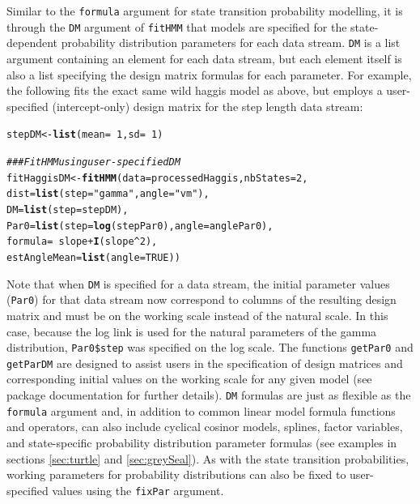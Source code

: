 \documentclass[12pt]{article}\usepackage[]{graphicx}\usepackage[]{color}
\makeatletter
\newcommand{\hlnum}[1]{\textcolor[rgb]{0.686,0.059,0.569}{#1}}%
\newcommand{\hlstr}[1]{\textcolor[rgb]{0.192,0.494,0.8}{#1}}%
\newcommand{\hlcom}[1]{\textcolor[rgb]{0.678,0.584,0.686}{\textit{#1}}}%
\newcommand{\hlopt}[1]{\textcolor[rgb]{0,0,0}{#1}}%
\newcommand{\hlstd}[1]{\textcolor[rgb]{0.345,0.345,0.345}{#1}}%
\newcommand{\hlkwb}[1]{\textcolor[rgb]{0.69,0.353,0.396}{#1}}%
\newcommand{\hlkwc}[1]{\textcolor[rgb]{0.333,0.667,0.333}{#1}}%
\newcommand{\hlkwd}[1]{\textcolor[rgb]{0.737,0.353,0.396}{\textbf{#1}}}%
\newenvironment{kframe}{%
 \def\at@end@of@kframe{}%
 \ifinner\ifhmode%
  \def\at@end@of@kframe{\end{minipage}}%
  \begin{minipage}{\columnwidth}%
 \fi\fi%
 \def\FrameCommand##1{\hskip\@totalleftmargin \hskip-\fboxsep
 \colorbox{shadecolor}{##1}\hskip-\fboxsep
     \hskip-\linewidth \hskip-\@totalleftmargin \hskip\columnwidth}%
 \MakeFramed {\advance\hsize-\width
   \@totalleftmargin\z@ \linewidth\hsize
   \@setminipage}}%
 {\par\unskip\endMakeFramed%
 \at@end@of@kframe}
\newenvironment{knitrout}{}{} %
\makeatother
\begin{document}
Similar to the \verb|formula| argument for state transition probability modelling, it is through the \verb|DM| argument of \verb|fitHMM| that models are specified for the state-dependent probability distribution parameters for each data stream.  \verb|DM| is a list argument containing an element for each data stream, but each element itself is also a list specifying the design matrix formulas for each parameter. For example, the following fits the exact same wild haggis model as above, but employs a user-specified (intercept-only) design matrix for the step length data stream:
\begin{knitrout}
\color{fgcolor}\begin{kframe}
\begin{alltt}
\hlstd{stepDM} \hlkwb{<-} \hlkwd{list}\hlstd{(}\hlkwc{mean} \hlstd{=} \hlopt{~}\hlnum{1}\hlstd{,} \hlkwc{sd} \hlstd{=} \hlopt{~}\hlnum{1}\hlstd{)}

\hlcom{### Fit HMM	using user-specified DM}
\hlstd{fitHaggisDM} \hlkwb{<-} \hlkwd{fitHMM}\hlstd{(}\hlkwc{data} \hlstd{= processedHaggis,} \hlkwc{nbStates} \hlstd{=} \hlnum{2}\hlstd{,}
                      \hlkwc{dist} \hlstd{=} \hlkwd{list}\hlstd{(}\hlkwc{step} \hlstd{=} \hlstr{"gamma"}\hlstd{,} \hlkwc{angle} \hlstd{=} \hlstr{"vm"}\hlstd{),}
                      \hlkwc{DM} \hlstd{=} \hlkwd{list}\hlstd{(}\hlkwc{step} \hlstd{= stepDM),}
                      \hlkwc{Par0} \hlstd{=} \hlkwd{list}\hlstd{(}\hlkwc{step} \hlstd{=} \hlkwd{log}\hlstd{(stepPar0),} \hlkwc{angle} \hlstd{= anglePar0),}
                      \hlkwc{formula} \hlstd{=} \hlopt{~} \hlstd{slope} \hlopt{+} \hlkwd{I}\hlstd{(slope}\hlopt{^}\hlnum{2}\hlstd{),}
                      \hlkwc{estAngleMean} \hlstd{=} \hlkwd{list}\hlstd{(}\hlkwc{angle}\hlstd{=}\hlnum{TRUE}\hlstd{))}
\end{alltt}
\end{kframe}
\end{knitrout}
Note that when \verb|DM| is specified for a data stream, the initial parameter values (\verb|Par0|) for that data stream now correspond to columns of the resulting design matrix and must be on the working scale instead of the natural scale.  In this case, because the log link is used for the natural parameters of the gamma distribution, \verb|Par0$step| was specified on the log scale.  The functions \verb|getPar0| and \verb|getParDM| are designed to assist users in the specification of design matrices and corresponding initial values on the working scale for any given model (see package documentation for further details).  \verb|DM| formulas are just as flexible as the \verb|formula| argument and, in addition to common linear model formula functions and operators, can also include cyclical cosinor models, splines, factor variables, and state-specific probability distribution parameter formulas (see examples in sections \ref{sec:turtle} and \ref{sec:greySeal}). As with the state transition probabilities, working parameters for probability distributions can also be fixed to user-specified values using the \verb|fixPar| argument.
\end{document}
